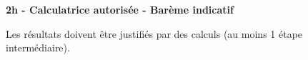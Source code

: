 \documentclass[12pt,a4paper]{article}  %
\begin{document}
\graphicspath{{../../images/}}

\begin{center}

\end{center}


\begin{center}\textbf{2h - Calculatrice autorisée - Barème indicatif}\end{center}


\begin{center}
Les résultats doivent être justifiés par des calculs (au moins 1 étape intermédiaire).
\end{center}
\end{document}
